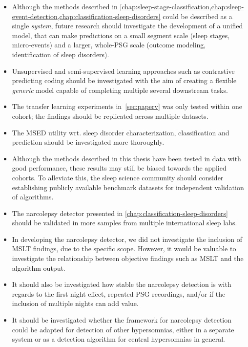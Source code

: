 \begin{itemize}[label=-]
\item Although the methods described in \cref{chap:sleep-stage-classification,chap:sleep-event-detection,chap:classification-sleep-disorders} could be described as a single \textit{system}, future research should investigate the development of a unified model, that can make predictions on a small segment scale (sleep stages, micro-events) and a larger, whole-\ac{PSG} scale (outcome modeling, identification of sleep disorders).
\item Unsupervised and semi-supervised learning approaches such as contrastive predicting coding should be investigated with the aim of creating a flexible \emph{generic} model capable of completing multiple several downstream tasks.
\item The transfer learning experiments in~\cref{sec:paperv} was only tested within one cohort; the findings should be replicated across multiple datasets.
\item The \ac{MSED} utility wrt. sleep disorder characterization, classification and prediction should be investigated more thoroughly.

\item Although the methods described in this thesis have been tested in data with good performance, these results may still be biased towards the applied cohorts. 
To alleviate this, the sleep science community should consider establishing publicly available benchmark datasets for independent validation of algorithms.
\item The narcolepsy detector presented in \cref{chap:classification-sleep-disorders} should be validated in more samples from multiple international sleep labs.
\item In developing the narcolepsy detector, we did not investigate the inclusion of \ac{MSLT} findings, due to the specific scope. However, it would be valuable to investigate the relationship between objective findings such as \ac{MSLT} and the algorithm output. 
\item It should also be investigated how stable the narcolepsy detection is with regards to the first night effect, repeated \ac{PSG} recordings, and/or if the inclusion of multiple nights can add value.
\item It should be investigated whether the framework for narcolepsy detection could be adapted for detection of other hypersomnias, either in a separate system or as a detection algorithm for central hypersomnias in general.
\end{itemize}